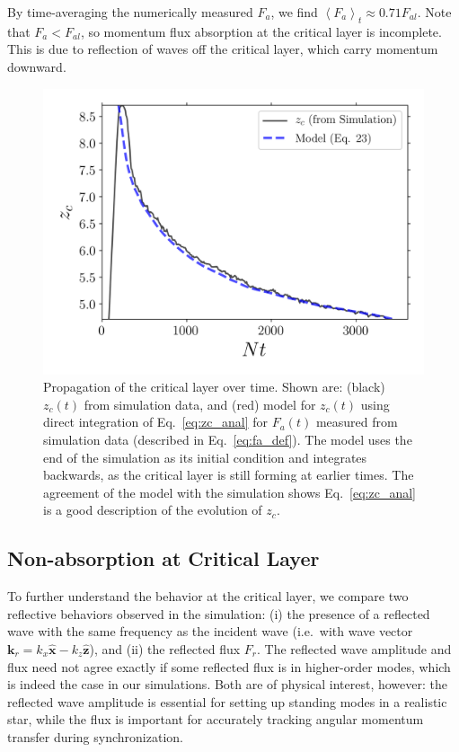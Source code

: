 \documentclass[
        fleqn,
        usenatbib,
    ]{mnras}
\newcommand*{\ev}[1]{\left\langle#1\right\rangle}
\newcommand*{\bm}[1]{\mathbf{#1}}
\newcommand*{\uv}[1]{\hat{\mathbf{#1}}}
\begin{document}
By time-averaging the numerically measured $F_a$, we find $\ev{F_a}_t \approx
0.71F_{al}$. Note that $F_a < F_{al}$, so momentum flux absorption at the
critical layer is incomplete. This is due to reflection of waves off the
critical layer, which carry momentum downward.
\begin{figure}
    \centering
    \includegraphics[width=0.9\columnwidth]{plots/nl_front.png}
    \caption{Propagation of the critical layer over time. Shown are: (black)
    $z_c(t)$ from simulation data, and (red) model for $z_c(t)$ using direct
    integration of Eq.~\eqref{eq:zc_anal} for $F_a(t)$ measured from simulation
    data (described in Eq.~\eqref{eq:fa_def}). The model uses the end of the
    simulation as its initial condition and integrates backwards, as the
    critical layer is still forming at earlier times. The agreement of the model
    with the simulation shows Eq.~\eqref{eq:zc_anal} is a good description of
    the evolution of $z_c$.}\label{fig:nl_front}
\end{figure}

\subsection{Non-absorption at Critical Layer}\label{ss:reflectivity}

To further understand the behavior at the critical layer, we compare two
reflective behaviors observed in the simulation: (i) the presence of a reflected
wave with the same frequency as the incident wave (i.e.\ with wave vector
$\bm{k}_r = k_{x}\uv{x} - k_{z}\uv{z}$), and (ii) the reflected flux $F_r$. The
reflected wave amplitude and flux need not agree exactly if some reflected flux
is in higher-order modes, which is indeed the case in our simulations. Both are
of physical interest, however: the reflected wave amplitude is essential for
setting up standing modes in a realistic star, while the flux is important for
accurately tracking angular momentum transfer during synchronization.
\end{document}
